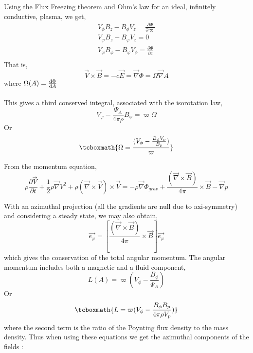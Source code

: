 \documentclass[10pt,a4paper,english]{article}
\begin{document}
Using the Flux Freezing theorem and Ohm's law for an ideal, infinitely conductive, plasma, we get,
\begin{align*}
   V_{\phi}B_{z}-B_{\phi}V_{z} = \frac{\partial \Phi}{\partial \varpi} \\
   V_{\varphi}B_{z}-B_{\varphi}V_{z} = 0 \\
   V_{\varphi}B_{\phi}-B_{\varphi}V_{\phi} = \frac{\partial \Phi}{\partial z} \\
\end{align*}
That is,
\begin{equation}
   \overrightarrow{V} \times \overrightarrow{B} = -c\overrightarrow{E} = \vec \nabla \Phi = \Omega\vec \nabla A
\end{equation}
where $\Omega(A) = \frac{\mathrm{d}{\Phi}}{\mathrm{d}{A}} $
\\
\\
This gives a third conserved integral, associated with the isorotation law,
\begin{equation}
   V_{\varphi} - \frac{\Psi_{A}}{4\pi\rho}B_{\varphi} = \varpi \Omega
\end{equation}
Or
\begin{equation}
    \tcboxmath{
       \Omega = \frac{(V_{\phi} - \frac{B_{\phi}V_{p}}{B_{p}})}{\varpi}
    }
\end{equation}

From the momentum equation,
\begin{equation}
   \rho\frac{\partial\overrightarrow{V}}{\partial t} + \frac{1}{2}\rho \vec \nabla V^{2} + \rho (\vec \nabla \times \overrightarrow{V}) \times \overrightarrow{V} = - \rho \vec \nabla \Phi_{grav} + \frac{(\vec \nabla \times \overrightarrow{B})}{4\pi} \times \overrightarrow{B}-\vec \nabla p
\end{equation}

With an azimuthal projection (all the gradients are null due to axi-symmetry) and considering a steady state, we may also obtain,
\begin{equation}
   [ \rho(\vec \nabla \times \overrightarrow{V}) \times \overrightarrow{V}]\overrightarrow{e_{\varphi}} = [\frac{(\vec \nabla \times \overrightarrow{B})}{4\pi} \times \overrightarrow{B}]\overrightarrow{e_{\varphi}}
\end{equation}
which gives the conservation of the total angular momentum. The angular momentum includes both a magnetic and a fluid component,
\begin{equation}
   L(A) = \varpi (V_{\phi} - \frac{B_{\phi}}{\Psi_{A}})
\end{equation}
Or
\begin{equation}
    \tcboxmath{
     L = \varpi (V_{\phi} - \frac{B_{\phi}B_{p}}{4\pi\rho V_{p}})
    }
\end{equation}
where the second term is the ratio of the Poynting flux density to the mass density. Thus when using these equations we get the azimuthal components of the fields :
\end{document}

